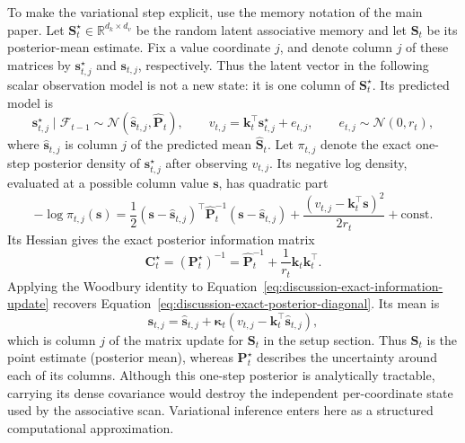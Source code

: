\documentclass[11pt]{article}
\newcommand{\vct}[1]{\boldsymbol{#1}}
\begin{document}
To make the variational step explicit, use the memory notation of the main paper. Let
$\vct{S}_t^\star\in\mathbb{R}^{d_k\times d_v}$ be the random latent associative memory and let
$\vct{S}_t$ be its posterior-mean estimate. Fix a value coordinate $j$, and denote column $j$ of
these matrices by $\vct{s}_{t,j}^\star$ and $\vct{s}_{t,j}$, respectively. Thus the latent vector
in the following scalar observation model is not a new state: it is one column of
$\vct{S}_t^\star$. Its predicted model is
\begin{equation}
  \vct{s}_{t,j}^\star\mid\mathcal{F}_{t-1}
  \sim\mathcal{N}(\widehat{\vct{s}}_{t,j},\widehat{\vct{P}}_t),
  \qquad
  v_{t,j}=\vct{k}_t^\top\vct{s}_{t,j}^\star+e_{t,j},
  \qquad
  e_{t,j}\sim\mathcal{N}(0,r_t),
  \label{eq:discussion-scalar-observation-model}
\end{equation}
where $\widehat{\vct{s}}_{t,j}$ is column $j$ of the predicted mean
$\widehat{\vct{S}}_t$. Let $\pi_{t,j}$ denote the exact one-step posterior density of
$\vct{s}_{t,j}^\star$ after observing $v_{t,j}$. Its negative log density, evaluated at a possible
column value $\vct{s}$, has quadratic part
\begin{equation}
  -\log \pi_{t,j}(\vct{s})
  =\frac{1}{2}(\vct{s}-\widehat{\vct{s}}_{t,j})^\top
    \widehat{\vct{P}}_t^{-1}
    (\vct{s}-\widehat{\vct{s}}_{t,j})
  +\frac{(v_{t,j}-\vct{k}_t^\top\vct{s})^2}{2r_t}
  +\mathrm{const}.
  \label{eq:discussion-posterior-objective}
\end{equation}
Its Hessian gives the exact posterior information matrix
\begin{equation}
  \vct{C}_t^\star
  =(\vct{P}_t^\star)^{-1}
  =\widehat{\vct{P}}_t^{-1}
  +\frac{1}{r_t}\vct{k}_t\vct{k}_t^\top.
  \label{eq:discussion-exact-information-update}
\end{equation}
Applying the Woodbury identity to Equation~\eqref{eq:discussion-exact-information-update}
recovers Equation~\eqref{eq:discussion-exact-posterior-diagonal}. Its mean is
\begin{equation}
  \vct{s}_{t,j}
  =\widehat{\vct{s}}_{t,j}
  +\vct{\kappa}_t
    \left(v_{t,j}-\vct{k}_t^\top\widehat{\vct{s}}_{t,j}\right),
  \label{eq:discussion-single-column-mean-update}
\end{equation}
which is column $j$ of the matrix update for $\vct{S}_t$ in the setup section. Thus
$\vct{S}_t$ is the point estimate (posterior mean), whereas $\vct{P}_t^\star$ describes the
uncertainty around each of its columns. Although this one-step posterior is analytically
tractable, carrying its dense covariance would destroy the independent per-coordinate state used
by the associative scan. Variational inference enters here as a structured computational
approximation.
\end{document}
